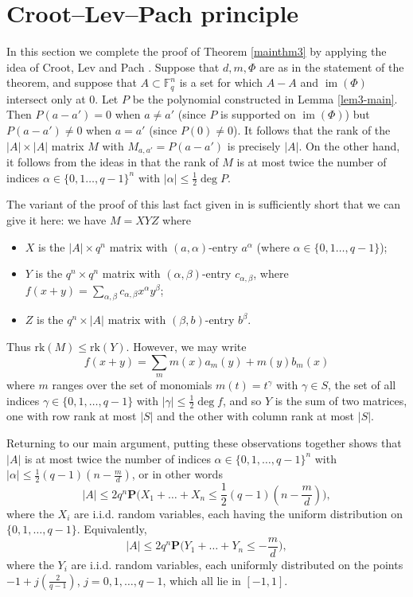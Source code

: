 \documentclass[12pt,reqno]{amsart}
\theoremstyle{definition}
\renewcommand{\leq}{\leqslant}
\newcommand\im{\operatorname{im}}
\def\F{\mathbb{F}}
\def\P{\mathbf{P}}
\numberwithin{equation}{section}
\begin{document}
 \section{Croot--Lev--Pach principle}
 
In this section we complete the proof of Theorem \ref{mainthm3} by applying the idea of Croot, Lev and Pach \cite{croot-lev-pach}.  Suppose that $d, m, \Phi$ are as in the statement of the theorem, and suppose that $A \subset \F_q^n$ is a set for which $A - A$ and $\im(\Phi)$ intersect only at $0$. Let $P$ be the polynomial constructed in Lemma \ref{lem3-main}. Then $P(a - a') = 0$ when $a \neq a'$ (since $P$ is supported on $\im (\Phi)$) but $P(a - a') \neq 0$ when $a = a'$ (since $P(0) \neq 0$). It follows that the rank of the $|A| \times |A|$ matrix $M$ with $M_{a,a'} = P(a - a')$ is precisely $|A|$. On the other hand, it follows from the ideas in \cite{croot-lev-pach} that the rank of $M$ is at most twice the number of indices $\alpha \in \{0,1\dots, q-1\}^n$ with $|\alpha| \leq \frac{1}{2}\deg P$. 

The variant of the proof of this last fact given in \cite{gijswijt} is sufficiently short that we can give it here: we have $M = XYZ$ where
\begin{itemize}
\item $X$ is the $|A| \times q^n$ matrix with $(a,\alpha)$-entry $a^{\alpha}$ (where $\alpha \in\{0,1\dots, q-1\}$);
\item $Y$ is the $q^n \times q^n$ matrix with $(\alpha, \beta)$-entry $c_{\alpha, \beta}$, where $f(x + y) =\sum_{\alpha, \beta} c_{\alpha, \beta} x^{\alpha} y^{\beta}$;
\item $Z$ is the $q^n \times |A|$ matrix with $(\beta, b)$-entry $b^{\beta}$.
\end{itemize}
Thus $\mbox{rk}(M) \leq \mbox{rk}(Y)$. However, we may write
\[ f(x+ y) = \sum_m m(x) a_m(y) + m(y) b_m(x)\] where $m$ ranges over the set  of monomials $m(t) = t^{\gamma}$ with $\gamma \in S$, the set of all indices $\gamma \in \{0,1,\dots, q-1\}$ with $|\gamma| \leq \frac{1}{2}\deg f$, and so $Y$ is the sum of two matrices, one with row rank at most $|S|$ and the other with column rank at most $|S|$. 


Returning to our main argument, putting these observations together shows that $|A|$ is at most twice the number of indices $\alpha \in \{0,1,\dots ,q-1\}^n$ with $|\alpha| \leq \frac{1}{2}(q - 1)(n - \frac{m}{d})$, or in other words
\[ |A| \leq 2q^n \P\big(X_1 + \dots + X_n \leq \frac{1}{2}(q - 1)(n - \frac{m}{d})\big),\]
where the $X_i$ are i.i.d. random variables, each having the uniform distribution on $\{0,1,\dots, q-1\}$. Equivalently, 
\begin{equation}\label{a-bound} |A| \leq 2q^n \P \big(Y_1 + \dots + Y_n \leq - \frac{m}{d}\big),\end{equation} where the $Y_i$ are i.i.d. random variables, each uniformly distributed on the points $-1 + j(\frac{2}{q-1})$, $j = 0,1,\dots, q-1$, which all lie in $[-1,1]$.
\end{document}
